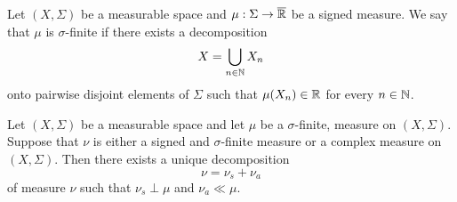 \begin{definition}
Let $(X,\Sigma)$ be a measurable space and $\mu:\Sigma \rightarrow \overline{{\mathbb R}}$ be a signed measure. We say that $\mu$ is $\sigma$-finite if there exists a decomposition
$$X = \bigcup_{n\in {\mathbb N}}X_n$$
onto pairwise disjoint elements of $\Sigma$ such that $\mu(X_n)\in {\mathbb R}$ for every $n\in {\mathbb N}$.
\end{definition}

\begin{theorem}\label{theorem:lebesguedecomposition}
Let $(X,\Sigma)$ be a measurable space and let $\mu$ be a $\sigma$-finite, measure on $(X,\Sigma)$. Suppose that $\nu$ is either a signed and $\sigma$-finite measure or a complex measure on $(X,\Sigma)$. Then there exists a unique decomposition 
$$\nu = \nu_s + \nu_a$$
of measure $\nu$ such that $\nu_s \perp \mu$ and $\nu_a \ll \mu$.
\end{theorem}
